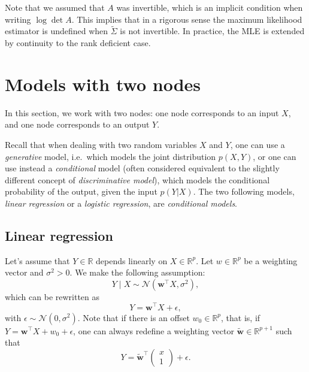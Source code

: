 \documentclass[12pt]{report}	%
\def\ts{\top}
\def\wb{\mathbf{w}}
\begin{document}
 Note that we assumed that $A$ was invertible, which is an implicit condition when writing $\log\det A$. This implies that in a rigorous sense the maximum likelihood estimator is undefined when $\tilde{\Sigma}$ is not invertible. In practice, the MLE is extended by continuity to the rank deficient case.
 
 \section{Models with two nodes}
 
In this section, we work with two nodes: one node corresponds to an input $X$, and one node corresponds to an output $Y$.

Recall that when dealing with two random variables $X$ and $Y$, one can use a \emph{generative} model, i.e.\ which models the joint distribution $p(X,Y)$, or one can use instead a \emph{conditional} model (often considered equivalent to the slightly different concept of \emph{discriminative model}), which models the conditional probability of the output, given the input $p(Y|X)$. The two following models, \emph{linear regression} or a \emph{logistic regression}, are \emph{conditional models}.

\subsection{Linear regression}

Let's assume that $Y\in\mathbb{R}$ depends linearly on $X\in\mathbb{R}^p$. Let $w\in\mathbb{R}^p$ be a weighting vector and $\sigma^2>0$. We make the following assumption:
$$Y \mid X \sim \mathcal{N}({\wb}^{\ts}   X,\sigma^2),$$
which can be rewritten as
$$Y = {\wb}^{\ts}X+\epsilon,$$
with $\epsilon \sim \mathcal{N}(0,\sigma^2)$. Note that if there is an offset $w_0\in\mathbb{R}^p$, that is, if $Y = {\wb}^{\ts}X+w_0+\epsilon$, one can always redefine a weighting vector $\tilde{\wb}\in\mathbb{R}^{p+1}$ such that $$Y=\tilde{\wb}^{\ts}\begin{pmatrix}x\\1\end{pmatrix}+\epsilon.$$
\end{document}
